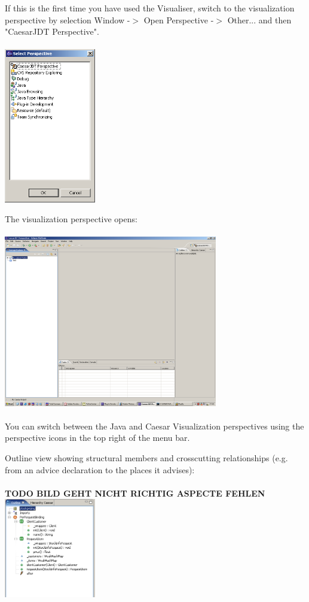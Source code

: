 If this is the first time you have used the Visualiser, switch to the visualization perspective by selection Window -$>$ Open Perspective -$>$ Other... and then "CaesarJDT Perspective".\\\\
\includegraphics[width=0.3\textwidth]{images/select_persp.png}

The visualization perspective opens:\\\\
\includegraphics[width=0.7\textwidth]{images/openpersp.png}\\\\

You can switch between the Java and Caesar Visualization perspectives using the perspective icons in the top right of the menu bar.\newpage

Outline view showing structural members and crosscutting relationships (e.g. from an advice declaration to the places it advises):\\\\
\textbf{TODO BILD GEHT NICHT RICHTIG ASPECTE FEHLEN}\\
\includegraphics[width=0.30\textwidth]{images/outline.png}\\\\

